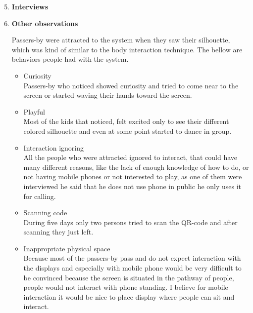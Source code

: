 \begin{enumerate}
\setcounter{enumi}{4}

\item \textbf{Interviews}



\newpage
\item \textbf{Other observations}


Passers-by were attracted to the system when they saw their silhouette, which was kind of similar to the body interaction technique. The bellow are behaviors people had with the system.

\begin{itemize}
\item Curiosity \\
Passers-by who noticed showed curiosity and tried to come near to the screen or started waving their hands toward the screen.
 

\item Playful   \\
Most of the kids that noticed, felt excited only to see their different colored silhouette and even at some point started to dance in group. 


\item Interaction ignoring \\
All the people who were attracted ignored to interact, that could have many different reasons, like the lack of enough knowledge of how to do, or not having mobile phones or not interested to play, as one of them were interviewed he said that he does not use phone in public he only uses it for calling. 

\item Scanning code \\ 
During five days only two persons tried to scan the QR-code and after scanning they just left.


\iffalse
\item Inappropriate physical space \\
Because most of the passers-by pass and do not expect interaction with the displays and especially with mobile phone would be very difficult to be convinced because the screen is situated in the pathway of people, people would not interact with phone standing. I believe for mobile interaction it would be nice to place display where people can sit and interact.


\end{itemize}
\end{enumerate}
